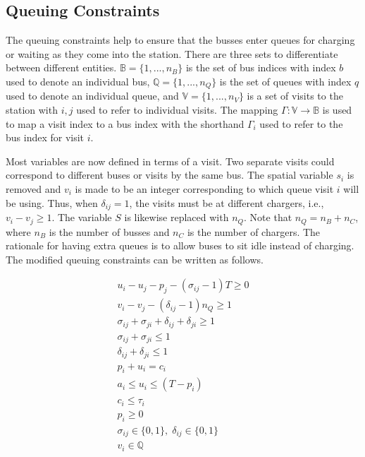 \documentclass[utf8]{FrontiersinHarvard}
\begin{document}
\subsection{Queuing Constraints} \label{sec:queuing}
\noindent
The queuing constraints help to ensure that the busses enter queues for charging or waiting as they come into the
station. There are three sets to differentiate between different entities. $\mathbb{B} = \{1, ..., n_B\}$ is the set of
bus indices with index $b$ used to denote an individual bus, $\mathbb{Q} = \{1, ..., n_Q\}$ is the set of queues with index $q$
used to denote an individual queue, and $\mathbb{V} = \{1, ..., n_V\}$ is a set of visits to the station with $i,j$ used
to refer to individual visits. The mapping $\Gamma: \mathbb{V} \rightarrow \mathbb{B}$ is used to map a visit index to a bus index with
the shorthand $\Gamma_i$ used to refer to the bus index for visit $i$.

Most variables are now defined in terms of a visit. Two separate visits could correspond to different buses or visits by
the same bus. The spatial variable $s_i$ is removed and $v_i$ is made to be an integer corresponding to which queue
visit $i$ will be using. Thus, when $\delta_{ij} = 1$, the visits must be at different chargers, i.e., $v_i-v_j \geq 1$. The
variable $S$ is likewise replaced with $n_Q$. Note that $n_Q = n_B + n_C$, where $n_B$ is the number of busses and $n_C$
is the number of chargers. The rationale for having extra queues is to allow buses to sit idle instead of charging. The
modified queuing constraints can be written as follows.

\begin{subequations}
\label{eq:packconstrs}
\begin{align}
    u_i - u_j - p_j - (\sigma_{ij} - 1)T \geq 0   \label{subeq:time}         \\
    v_i - v_j - (\delta_{ij} - 1)n_Q \geq 1       \label{subeq:space}        \\
    \sigma_{ij} + \sigma_{ji} + \delta_{ij} + \delta_{ji} \geq 1 \label{subeq:valid_pos}    \\
    \sigma_{ij} + \sigma_{ji} \leq 1                   \label{subeq:sigma}        \\
    \delta_{ij} + \delta_{ji} \leq 1                   \label{subeq:delta}        \\
    p_i + u_i = c_i                       \label{subeq:detach}       \\
    a_i \leq u_i \leq (T - p_i)                 \label{subeq:valid_starts} \\
    c_i \leq \tau_i                             \label{subeq:valid_depart} \\
    p_i \geq 0                               \label{subeq:pos_charge} \\
    \sigma_{ij} \in \{0,1\},\;\delta_{ij} \in \{0,1\}   \label{subeq:sdspace}      \\
    v_i \in \mathbb{Q}                               \label{subeq:vspace}
\end{align}
\end{subequations}
\end{document}
